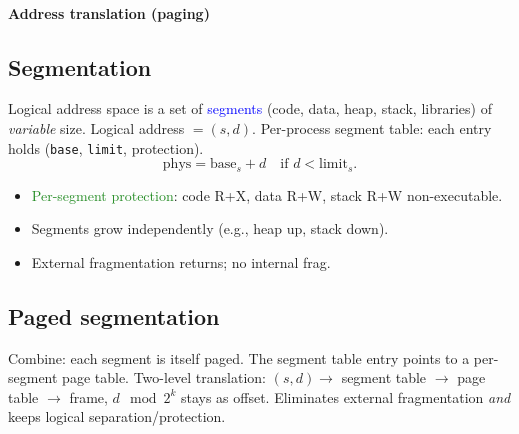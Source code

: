 \paragraph{Address translation (paging)}
\begin{center}
\end{center}

\subsection{Segmentation}
Logical address space is a set of \textcolor{Blue}{segments} (code, data, heap, stack, libraries) of \emph{variable} size. Logical address $=(s, d)$.
Per-process \textcolor{Bittersweet}{segment table}: each entry holds (\texttt{base}, \texttt{limit}, protection).
\[\text{phys}=\text{base}_s + d\quad\text{if } d<\text{limit}_s.\]
\begin{itemize}
  \item \textcolor{ForestGreen}{Per-segment protection}: code R+X, data R+W, stack R+W non-executable.
  \item Segments grow independently (e.g., heap up, stack down).
  \item \textcolor{Bittersweet}{External fragmentation} returns; no internal frag.
\end{itemize}

\subsection{Paged segmentation}
Combine: each segment is itself paged. The segment table entry points to a per-segment page table.
Two-level translation: $(s, d) \to$ segment table $\to$ page table $\to$ frame, $d \!\!\mod 2^k$ stays as offset.
Eliminates external fragmentation \emph{and} keeps logical separation/protection.

